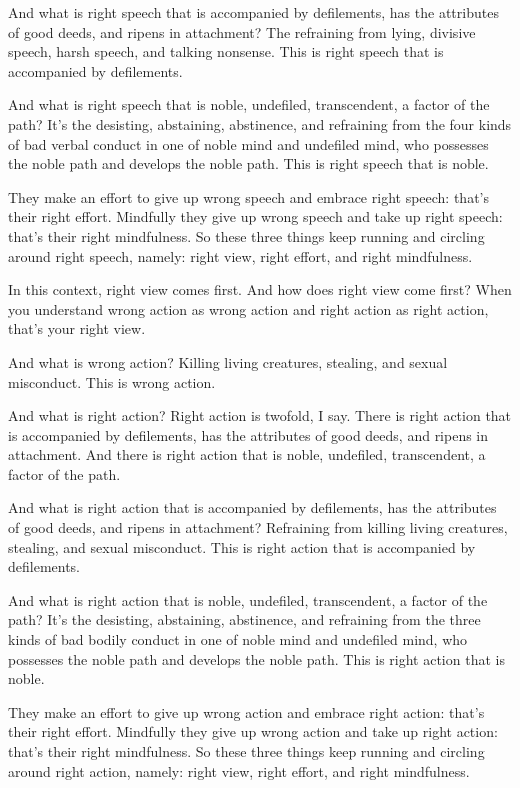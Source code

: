 \documentclass[12pt,openany]{book}%
\begin{document}
And what is right speech that is accompanied by defilements, has the attributes of good deeds, and ripens in attachment? The refraining from lying, divisive speech, harsh speech, and talking nonsense. This is right speech that is accompanied by defilements. 

And what is right speech that is noble, undefiled, transcendent, a factor of the path? It’s the desisting, abstaining, abstinence, and refraining from the four kinds of bad verbal conduct in one of noble mind and undefiled mind, who possesses the noble path and develops the noble path. This is right speech that is noble. 

They make an effort to give up wrong speech and embrace right speech: that’s their right effort. Mindfully they give up wrong speech and take up right speech: that’s their right mindfulness. So these three things keep running and circling around right speech, namely: right view, right effort, and right mindfulness. 

In this context, right view comes first. And how does right view come first? When you understand wrong action as wrong action and right action as right action, that’s your right view. 

And what is wrong action? Killing living creatures, stealing, and sexual misconduct. This is wrong action. 

And what is right action? Right action is twofold, I say. There is right action that is accompanied by defilements, has the attributes of good deeds, and ripens in attachment. And there is right action that is noble, undefiled, transcendent, a factor of the path. 

And what is right action that is accompanied by defilements, has the attributes of good deeds, and ripens in attachment? Refraining from killing living creatures, stealing, and sexual misconduct. This is right action that is accompanied by defilements. 

And what is right action that is noble, undefiled, transcendent, a factor of the path? It’s the desisting, abstaining, abstinence, and refraining from the three kinds of bad bodily conduct in one of noble mind and undefiled mind, who possesses the noble path and develops the noble path. This is right action that is noble. 

They make an effort to give up wrong action and embrace right action: that’s their right effort. Mindfully they give up wrong action and take up right action: that’s their right mindfulness. So these three things keep running and circling around right action, namely: right view, right effort, and right mindfulness. 
\end{document}
